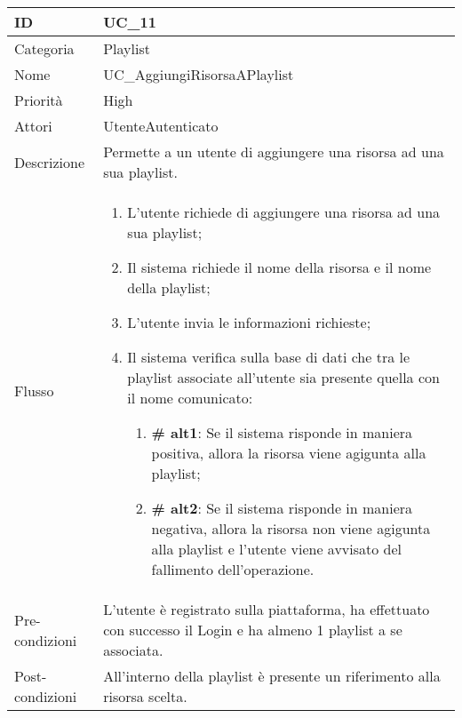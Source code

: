 \begin{center}
\begin{tabular}{ |p{2cm}|p{13cm}|  }
\hline
ID & UC\_11 \\\hline
Categoria & Playlist\\\hline
Nome & UC\_AggiungiRisorsaAPlaylist\\\hline
Priorità & High \\\hline
Attori &  UtenteAutenticato \\\hline
Descrizione & Permette a un utente di aggiungere una risorsa ad una sua playlist.\\\hline
Flusso &  	\begin{enumerate}
			\item L'utente richiede di aggiungere una risorsa ad una sua playlist;
			\item Il sistema richiede il nome della risorsa e il nome della playlist;
			\item L'utente invia le informazioni richieste;
			\item Il sistema verifica sulla base di dati che tra le playlist associate all'utente sia presente quella con il nome comunicato:
			\begin{enumerate}[  ]
				\item \textbf{\# alt1}: Se il sistema risponde in maniera positiva, allora la risorsa viene agigunta alla playlist;
				\item \textbf{\# alt2}: Se il sistema risponde in maniera negativa, allora la risorsa non viene  agigunta alla playlist e l'utente viene avvisato del fallimento dell'operazione.
			\end{enumerate}
		\end{enumerate}\\\hline
Pre-condizioni & L'utente è registrato sulla piattaforma, ha effettuato con successo il Login e ha almeno 1 playlist a se associata.\\\hline
Post-condizioni & All'interno della playlist è presente un riferimento alla risorsa scelta.\\\hline
\end{tabular}
\label{table_use_case:11}\newline


\end{center}
